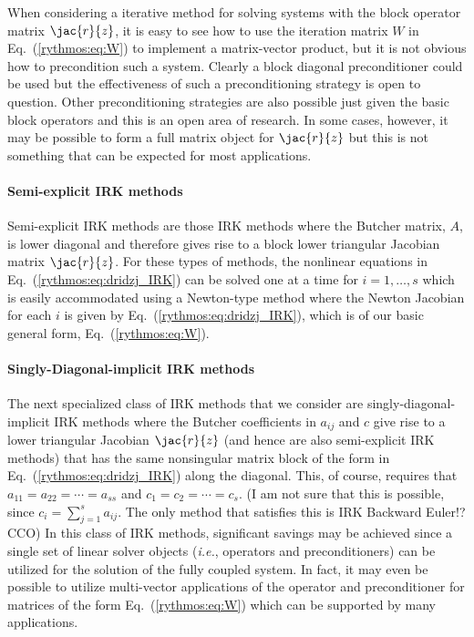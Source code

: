When considering a iterative method for solving systems with the block
operator matrix $\jac{r}{z}$, it is easy to see how to use the iteration
matrix $W$ in Eq.~(\ref{rythmos:eq:W}) to implement a matrix-vector
product, but it is not obvious how to precondition such a system.
Clearly a block diagonal preconditioner could be used but the effectiveness
of such a preconditioning strategy is open to question. Other preconditioning
strategies are also possible just given the basic block operators
and this is an open area of research. In some cases, however, it may
be possible to form a full matrix object for $\jac{r}{z}$ but this
is not something that can be expected for most applications.


\paragraph{Semi-explicit IRK methods}

Semi-explicit IRK methods are those IRK methods where the Butcher
matrix, $A$, is lower diagonal and therefore gives rise to a block
lower triangular Jacobian matrix $\jac{r}{z}$. For these types of
methods, the nonlinear equations in Eq.~(\ref{rythmos:eq:dridzj_IRK})
can be solved one at a time for $i=1,\ldots,s$ which is easily accommodated
using a Newton-type method where the Newton Jacobian for each $i$
is given by Eq.~(\ref{rythmos:eq:dridzj_IRK}), which is of our basic
general form, Eq.~(\ref{rythmos:eq:W}).


\paragraph{Singly-Diagonal-implicit IRK methods}

The next specialized class of IRK methods that we consider are singly-diagonal-implicit
IRK methods where the Butcher coefficients in $a_{ij}$ and $c$ give
rise to a lower triangular Jacobian $\jac{r}{z}$ (and hence are also
semi-explicit IRK methods) that has the same nonsingular matrix block
of the form in Eq.~(\ref{rythmos:eq:dridzj_IRK}) along the diagonal.
This, of course, requires that $a_{11}=a_{22}=\cdots=a_{ss}$ and
$c_{1}=c_{2}=\cdots=c_{s}$. (I am not sure that this is possible,
since $c_{i}=\sum_{j=1}^{s}a_{ij}$. The only method that satisfies
this is IRK Backward Euler!? CCO) In this class of IRK methods, significant
savings may be achieved since a single set of linear solver objects
(\emph{i.e.}, operators and preconditioners) can be utilized for the
solution of the fully coupled system. In fact, it may even be possible
to utilize multi-vector applications of the operator and preconditioner
for matrices of the form Eq.~(\ref{rythmos:eq:W}) which can be supported
by many applications. 


